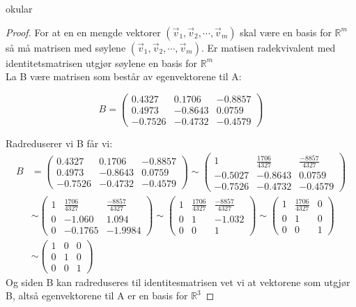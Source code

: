 okular\documentclass[a4paper, norsk, twoside, 10pt]{article}
\begin{document}
\begin{proof}
For at en en mengde vektorer $(\vec{v}_{1}, \vec{v}_{2}, \cdots, \vec{v}_{m})$ skal være en basis for
$\mathbb{R}^{m}$ så må matrisen med søylene $(\vec{v}_{1}, \vec{v}_{2}, \cdots, \vec{v}_{m})$. Er matisen radekvivalent med identitetsmatrisen utgjør søylene en basis for $\mathbb{R}^{m}$
\\
La B være matrisen som består av egenvektorene til A:
\def\Bmatrise{
\begin{pmatrix}
  0.4327 & 0.1706 & -0.8857\\
  0.4973 & -0.8643 & 0.0759\\
  -0.7526 & -0.4732 & -0.4579
\end{pmatrix}
}

\[B = \Bmatrise\]

Radreduserer vi B får vi:
\[\begin{split}
B &= \Bmatrise \sim
\begin{pmatrix}
  1 & \frac{1706}{4327} & \frac{-8857}{4327}\\
  -0.5027 & -0.8643 & 0.0759\\
  -0.7526 & -0.4732 & -0.4579
\end{pmatrix} \\
&\sim 
\begin{pmatrix}
  1 & \frac{1706}{4327} & \frac{-8857}{4327}\\
  0 & -1.060 & 1.094\\
  0 & -0.1765 & -1.9984
\end{pmatrix}
\sim
\begin{pmatrix}
  1 & \frac{1706}{4327} & \frac{-8857}{4327}\\
  0 & 1 & -1.032\\
  0 & 0 & 1
\end{pmatrix}
\sim
\begin{pmatrix}
  1 & \frac{1706}{4327} & 0\\
  0 & 1 & 0\\
  0 & 0 & 1
\end{pmatrix}
\\ &\sim
\begin{pmatrix}
  1 & 0 & 0\\
  0 & 1 & 0\\
  0 & 0 & 1
\end{pmatrix}
\end{split}\]
Og siden B kan radreduseres til identitesmatrisen vet vi at vektorene som utgjør B, altså egenvektorene til A er en basis for $\mathbb{R}^{3}$
\end{proof}
\end{document}
